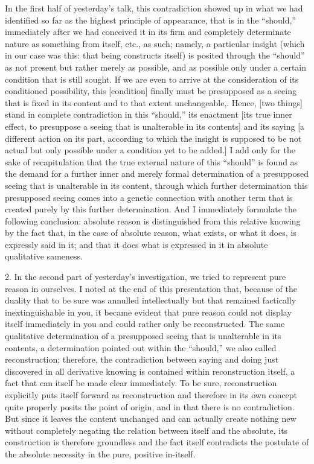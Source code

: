 In the first half of yesterday's talk,
this contradiction showed up
in what we had identified so far as
the highest principle of appearance,
that is in the “should,”
immediately after we had conceived it
in its firm and completely determinate nature
as something from itself, etc., as such;
namely, a particular insight
(which in our case was this:
that being constructs itself)
is posited through the “should”
as not present but rather merely as possible,
and as possible only under a certain condition
that is still sought.
If we are even to arrive at the consideration of
its conditioned possibility,
this [condition] finally must be presupposed as
a seeing that is fixed in its content
and to that extent unchangeable,.
Hence, [two things] stand in
complete contradiction in this “should,”
its enactment [its true inner effect,
to presuppose a seeing that is unalterable in its contents]
and its saying [a different action on its part,
according to which the insight is supposed
to be not actual but only possible
under a condition yet to be added.]
I add only for the sake of recapitulation
that the true external nature of this “should” is
found as the demand for a further inner
and merely formal determination
of a presupposed seeing that is
unalterable in its content,
through which further determination
this presupposed seeing comes into
a genetic connection with another term
that is created purely by this further determination.
And I immediately formulate the following conclusion:
absolute reason is distinguished from this relative knowing
by the fact that, in the case of absolute reason,
what exists, or what it does, is expressly said in it;
and that it does what is expressed in it
in absolute qualitative sameness.

2. In the second part of yesterday's investigation,
we tried to represent pure reason in ourselves.
I noted at the end of this presentation that,
because of the duality that to be sure was annulled intellectually
but that remained factically inextinguishable in you,
it became evident that pure reason could not
display itself immediately in you
and could rather only be reconstructed.
The same qualitative determination of
a presupposed seeing that is unalterable in its contents,
a determination pointed out within the “should,”
we also called reconstruction;
therefore, the contradiction between saying and doing
just discovered in all derivative knowing is
contained within reconstruction itself,
a fact that can itself be made clear immediately.
To be sure, reconstruction explicitly puts
itself forward as reconstruction
and therefore in its own concept
quite properly posits the point of origin,
and in that there is no contradiction.
But since it leaves the content unchanged
and can actually create nothing new
without completely negating the relation
between itself and the absolute,
its construction is therefore groundless
and the fact itself contradicts the postulate
of the absolute necessity in
the pure, positive in-itself.


